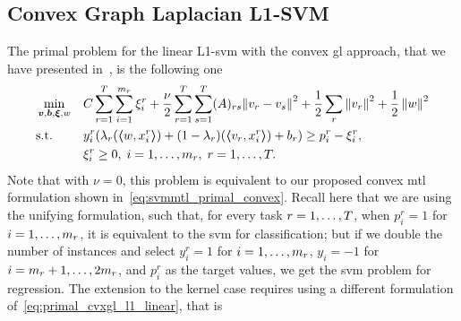 \subsection{Convex Graph Laplacian L1-SVM}
%
The primal problem for the linear L1-\acrshort{svm} with the convex \acrshort{gl} approach, that we have presented in~\citep*{RuizAD20}, is the following one
%
\begin{equation}\label{eq:primal_cvxgl_l1_linear}
    \begin{aligned}
         & \min_{\fv{v}, \fv{b}, \fv{\xi}, w}
         &                                             & { C \sum_{r=1}^\ntasks \sum_{i=1}^{\npertask_r} {\xi_i^r}  + \frac{\nu}{2} \sum_{r=1}^\ntasks \sum_{s=1}^T (A)_{rs} {\| {v}_r - {v}_s \|}^2 + \frac{1}{2} \sum_r \norm{{v}_r}^2 + \frac{1}{2} \norm{{w}}^2}                                                                              \\
         & \text{s.t.}
         &                                             & y_i^r (\lambda_r (\dotp{w}{{x}_i^r}) + (1 - \lambda_r) (\dotp{{v}_r}{{x}_i^r}) + b_r) \geq p_i^r - \xi_i^r  ,                                                                                                                                                                            \\
         &                                             &                                                                                                                                                                                                           & \xi_i^r \geq 0,  \;  i = 1, \dotsc, \npertask_r, \; r=1, \dotsc, \ntasks .
    \end{aligned}
\end{equation}
%
Note that with $\nu=0$, this problem is equivalent to our proposed convex \acrshort{mtl} formulation shown in~\eqref{eq:svmmtl_primal_convex}. Recall here that we are using the unifying formulation, such that, for every task $r=1, \ldots, T$, when $p_i^r = 1$ for $i=1, \ldots, m_r$, it is equivalent to the \acrshort{svm} for classification; but if we double the number of instances and select $y_i^r = 1$ for $i=1, \ldots, m_r$, $y_i= -1$ for $i = m_r+1, \ldots, 2 m_r$, and $p_i^r$ as the target values, we get the \acrshort{svm} problem for regression.
%
The extension to the kernel case requires using a different formulation of~\eqref{eq:primal_cvxgl_l1_linear}, that is
